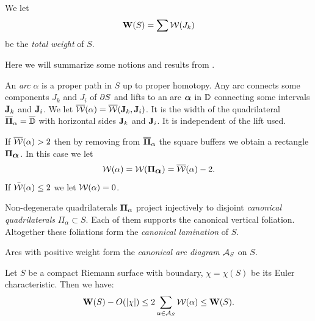  We let
$$
  {\mathbf{W}}(S) = \sum {\mathcal W}(J_k)
$$
be the {\it total weight} of $S$. 


  Here we will summarize some notions and results  from \cite{K}. 

  An {\it arc}  $\alpha$ is a proper path in $S$ up to proper homotopy. 
Any arc connects some components $J_k$ and $J_i$ of $\partial S$
and lifts to an arc ${\mbox{\boldmath$\alpha$} }$ in ${\Bbb D}$ connecting some intervals ${\mathbf{J}}_k$
and ${\mathbf{J}}_i$. We let  $\overline{{\mathcal W}}(\alpha)= \overline{{\mathcal W}}({\mathbf{J}}_k, {\mathbf{J}}_i)$.
It is the width of the quadrilateral $\overline {{\boldsymbol{\Pi}}}_\alpha=\overline {{\Bbb D}}$ with
horizontal sides ${\mathbf{J}}_k$ and ${\mathbf{J}}_i$.  
It is independent of the lift used. 

If $\overline{{\mathcal W}}(\alpha)> 2$ then
by removing from $\overline{{\boldsymbol{\Pi}}}_\alpha$ the square buffers we obtain a
rectangle ${\boldsymbol{\Pi}}_{\mbox{\boldmath$\alpha$} }$.  In this case we let
$$
      {\mathcal W}(\alpha) = {\mathcal W}({\boldsymbol{\Pi}}_{\mbox{\boldmath$\alpha$} })  = \overline {{\mathcal W}}(\alpha)-2.
$$ 
If $\bar{{\mathcal W}}(\alpha)\leq 2$ we let  ${\mathcal W}(\alpha) =0$.

Non-degenerate quadrilaterals ${\boldsymbol{\Pi}}_\alpha$ project injectively to 
disjoint  {\it canonical quadrilaterals} $\Pi_\alpha\subset S$.  
Each of them supports the canonical
vertical foliation. Altogether these foliations form the
{\it canonical lamination} of $S$. 

Arcs with positive weight form the {\it canonical arc diagram}
${\mathcal A}_S$ on $S$.



\begin{thm}\label{thin-thick for S}
   Let $S$ be  a compact Riemann surface with boundary,
$\chi=\chi(S)$ be its Euler characteristic. Then  we have:
$$
    {\mathbf{W}}(S)  -  O( | \chi | ) \leq   2 \sum_{\alpha\in {\mathcal A}_S}  {\mathcal W}(\alpha)  \leq {\mathbf{W}}(S). 
$$
\end{thm}

